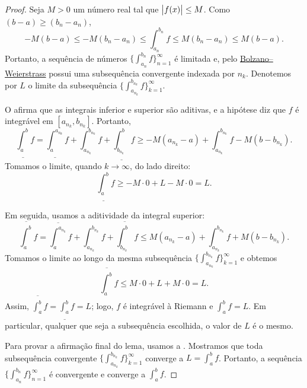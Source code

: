 \begin{proof}
Seja $M > 0$ um número real tal que $\bigl\lvert {f(x)} \bigr\rvert \leq M$.
Como $(b-a) \geq (b_n-a_n)$,
\begin{equation*}
-M(b-a) \leq
-M(b_n-a_n) \leq
\int_{a_n}^{b_n} f
\leq
M(b_n-a_n) \leq
M(b-a) .
\end{equation*}
Portanto, a sequência de números
$\bigl\{ \int_{a_n}^{b_n} f \bigr\}_{n=1}^\infty$ é limitada e, pelo
\hyperref[thm:bwseq]{Bolzano--Weierstrass}
possui uma subsequência convergente indexada por $n_k$. Denotemos por
$L$ o limite da subsequência
$\bigl\{ \int_{a_{n_k}}^{b_{n_k}} f \bigr\}_{k=1}^\infty$.

O  afirma que as integrais inferior e superior
são aditivas, e a hipótese diz que $f$ é integrável em
$[a_{n_k},b_{n_k}]$. Portanto,
\begin{equation*}
\underline{\int_a^b} f
=
\underline{\int_a^{a_{n_k}}} f
+
\int_{a_{n_k}}^{b_{n_k}} f
+
\underline{\int_{b_{n_k}}^b} f
\geq
-M(a_{n_k}-a)
+
\int_{a_{n_k}}^{b_{n_k}} f
-
M(b-b_{n_k}) .
\end{equation*}
Tomamos o limite, quando $k \to \infty$, do lado direito:
\begin{equation*}
\underline{\int_a^b} f
\geq
-M\cdot 0
+
L
-
M\cdot 0
= L .
\end{equation*}

Em seguida, usamos a aditividade da integral superior:
\begin{equation*}
\overline{\int_a^b} f
=
\overline{\int_a^{a_{n_k}}} f
+
\int_{a_{n_k}}^{b_{n_k}} f
+
\overline{\int_{b_{n_k}}^b} f
\leq
M(a_{n_k}-a)
+
\int_{a_{n_k}}^{b_{n_k}} f
+
M(b-b_{n_k}) .
\end{equation*}
Tomamos o limite ao longo da mesma subsequência
$\{ \int_{a_{n_k}}^{b_{n_k}} f \}_{k=1}^\infty$ e obtemos
\begin{equation*}
\overline{\int_a^b} f
\leq
M\cdot 0
+
L
+
M\cdot 0
= L .
\end{equation*}
Assim, $\overline{\int_a^b} f = \underline{\int_a^b} f = L$;
logo, $f$ é integrável à Riemann e $\int_a^b f = L$.
Em particular, qualquer que seja a subsequência escolhida,
o valor de $L$ é o mesmo.

Para provar a afirmação final do lema, usamos a
. Mostramos que toda subsequência convergente
$\bigl\{ \int_{a_{n_k}}^{b_{n_k}} f \bigr\}_{k=1}^\infty$ converge a
$L = \int_a^b f$. Portanto, a sequência
$\bigl\{ \int_{a_n}^{b_n} f \bigr\}_{n=1}^\infty$ é convergente e converge a
$\int_a^b f$.
\end{proof}

